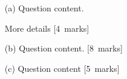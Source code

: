 %
%
%

\begin{itemize}

\item[(a)] Question content.

More details [4~marks]

\item[(b)] Question content. [8~marks]

\item[(c)] Question content [5~marks]

\end{itemize}

%